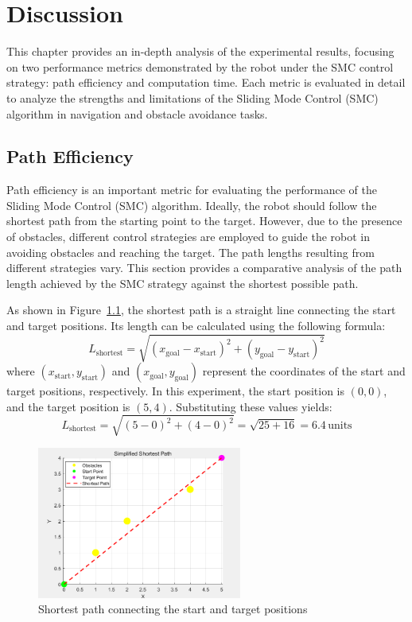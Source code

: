 \chapter{Discussion}

This chapter provides an in-depth analysis of the experimental results, focusing on two performance metrics demonstrated by the robot under the SMC control strategy:  path efficiency and computation time. Each metric is evaluated in detail to analyze the strengths and limitations of the Sliding Mode Control (SMC) algorithm in navigation and obstacle avoidance tasks.


\section{Path Efficiency}

Path efficiency is an important metric for evaluating the performance of the Sliding Mode Control (SMC) algorithm. Ideally, the robot should follow the shortest path from the starting point to the target. However, due to the presence of obstacles, different control strategies are employed to guide the robot in avoiding obstacles and reaching the target. The path lengths resulting from different strategies vary. This section provides a comparative analysis of the path length achieved by the SMC strategy against the shortest possible path.

As shown in Figure~\ref{fig:shortest_path}, the shortest path is a straight line connecting the start and target positions. Its length can be calculated using the following formula:
\begin{equation}
L_{\text{shortest}} = \sqrt{(x_{\text{goal}} - x_{\text{start}})^2 + (y_{\text{goal}} - y_{\text{start}})^2}
\end{equation}
where $(x_{\text{start}}, y_{\text{start}})$ and $(x_{\text{goal}}, y_{\text{goal}})$ represent the coordinates of the start and target positions, respectively. In this experiment, the start position is $(0, 0)$, and the target position is $(5, 4)$. Substituting these values yields:
\begin{equation}
L_{\text{shortest}} = \sqrt{(5 - 0)^2 + (4 - 0)^2} = \sqrt{25 + 16} = 6.4 \, \text{units}
\end{equation}

\begin{figure}[ht]
    \centering
    \includegraphics[width=0.6\textwidth]{image/12.PNG}
    \caption{Shortest path connecting the start and target positions}
    \label{fig:shortest_path}
\end{figure}

